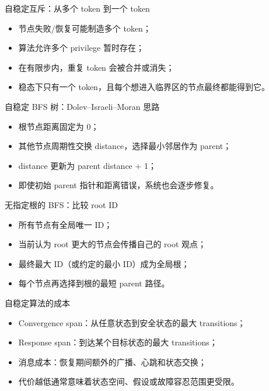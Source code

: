 \documentclass[UTF8,fontset=none,aspectratio=169,10pt]{beamer}
\begin{document}
\begin{frame}{自稳定互斥：从多个 token 到一个 token}
\begin{itemize}
  \item 节点失败/恢复可能制造多个 token；
  \item 算法允许多个 privilege 暂时存在；
  \item 在有限步内，重复 token 会被合并或消失；
  \item 稳态下只有一个 token，且每个想进入临界区的节点最终都能得到它。
\end{itemize}
\vfill
{}
\end{frame}

\begin{frame}{自稳定 BFS 树：Dolev--Israeli--Moran 思路}
\begin{itemize}
  \item 根节点距离固定为 0；
  \item 其他节点周期性交换 distance，选择最小邻居作为 parent；
  \item distance 更新为 parent distance + 1；
  \item 即使初始 parent 指针和距离错误，系统也会逐步修复。
\end{itemize}
\end{frame}

\begin{frame}{无指定根的 BFS：比较 root ID}
\begin{itemize}
  \item 所有节点有全局唯一 ID；
  \item 当前认为 root 更大的节点会传播自己的 root 观点；
  \item 最终最大 ID（或约定的最小 ID）成为全局根；
  \item 每个节点再选择到根的最短 parent 路径。
\end{itemize}
\end{frame}

\begin{frame}{自稳定算法的成本}
\begin{itemize}
  \item Convergence span：从任意状态到安全状态的最大 transitions；
  \item Response span：到达某个目标状态的最大 transitions；
  \item 消息成本：恢复期间额外的广播、心跳和状态交换；
  \item 代价越低通常意味着状态空间、假设或故障容忍范围更受限。
\end{itemize}
\end{frame}
\end{document}
